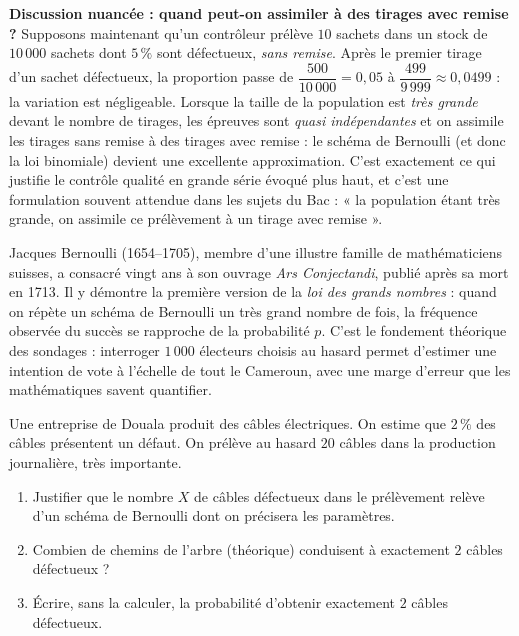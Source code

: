 \documentclass[11pt]{article}
\begin{document}
\textbf{Discussion nuancée : quand peut-on assimiler à des tirages avec remise ?} Supposons maintenant qu'un contrôleur prélève $10$ sachets dans un stock de $10\,000$ sachets dont $5\,\%$ sont défectueux, \emph{sans remise}. Après le premier tirage d'un sachet défectueux, la proportion passe de $\dfrac{500}{10\,000} = 0{,}05$ à $\dfrac{499}{9\,999} \approx 0{,}0499$ : la variation est négligeable. Lorsque la taille de la population est \emph{très grande} devant le nombre de tirages, les épreuves sont \emph{quasi indépendantes} et on assimile les tirages sans remise à des tirages avec remise : le schéma de Bernoulli (et donc la loi binomiale) devient une excellente approximation. C'est exactement ce qui justifie le contrôle qualité en grande série évoqué plus haut, et c'est une formulation souvent attendue dans les sujets du Bac : « la population étant très grande, on assimile ce prélèvement à un tirage avec remise ».

\begin{savaistu}
Jacques Bernoulli (1654--1705), membre d'une illustre famille de mathématiciens suisses, a consacré vingt ans à son ouvrage \emph{Ars Conjectandi}, publié après sa mort en 1713. Il y démontre la première version de la \emph{loi des grands nombres} : quand on répète un schéma de Bernoulli un très grand nombre de fois, la fréquence observée du succès se rapproche de la probabilité $p$. C'est le fondement théorique des sondages : interroger $1\,000$ électeurs choisis au hasard permet d'estimer une intention de vote à l'échelle de tout le Cameroun, avec une marge d'erreur que les mathématiques savent quantifier.
\end{savaistu}

\begin{exercice}
Une entreprise de Douala produit des câbles électriques. On estime que $2\,\%$ des câbles présentent un défaut. On prélève au hasard $20$ câbles dans la production journalière, très importante.
\begin{enumerate}
\item Justifier que le nombre $X$ de câbles défectueux dans le prélèvement relève d'un schéma de Bernoulli dont on précisera les paramètres.
\item Combien de chemins de l'arbre (théorique) conduisent à exactement $2$ câbles défectueux ?
\item Écrire, sans la calculer, la probabilité d'obtenir exactement $2$ câbles défectueux.
\end{enumerate}
\end{exercice}
\end{document}
